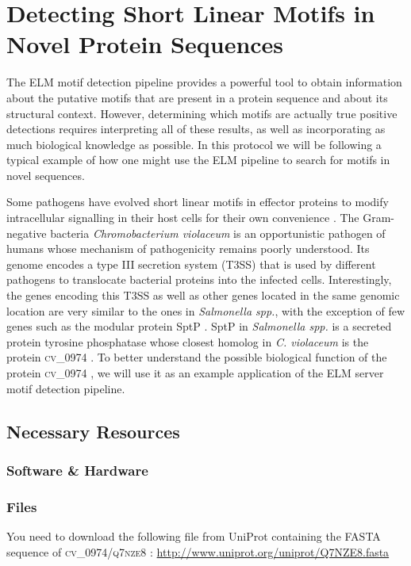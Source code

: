 \documentclass[12pt]{article}
\newcounter{proto}
\newcommand\uniprot[1]{%
	\textsc{\lowercase{#1}}%
}
\begin{document}

\section{Detecting Short Linear Motifs in Novel Protein Sequences}
\label{sec:predicting_cv_0974}

The ELM motif detection pipeline provides a powerful tool to obtain
information about the putative motifs that are present in a protein sequence and about its structural
context. However, determining which motifs are actually true positive detections
requires interpreting all of these results, as well as incorporating as much
biological knowledge as possible. In this protocol we will be following a typical
example of how one might use the ELM pipeline to search for motifs in novel
sequences.

Some pathogens have evolved short linear motifs in effector proteins to modify
intracellular signalling in their host cells for their own convenience
\citep{25475989}. The Gram-negative bacteria \textit{Chromobacterium violaceum} is an
opportunistic pathogen of humans whose mechanism of pathogenicity remains poorly
understood. Its genome encodes a type III secretion system (T3SS) that is used
by different pathogens to translocate bacterial proteins into the infected cells.
Interestingly, the genes encoding this T3SS as well as other genes located in
the same genomic location are very similar to the ones in \textit{Salmonella spp.}, with
the exception of few genes such as the modular protein SptP \citep{15100995}.
SptP in \textit{Salmonella spp.} is a secreted protein tyrosine phosphatase
\citep{8866485} whose closest homolog in \textit{C. violaceum} is the protein
\uniprot{CV\_0974}. To better understand the possible biological function of the
protein \uniprot{CV\_0974}, we will use it as an example application of the
ELM server motif detection pipeline.

%
%
\subsection*{Necessary Resources}
\subsubsection*{Software \& Hardware}

\subsubsection*{Files}
You need to download the following file from UniProt containing the FASTA
sequence of \uniprot{CV\_0974/Q7NZE8}:
\url{http://www.uniprot.org/uniprot/Q7NZE8.fasta}
\end{document}
